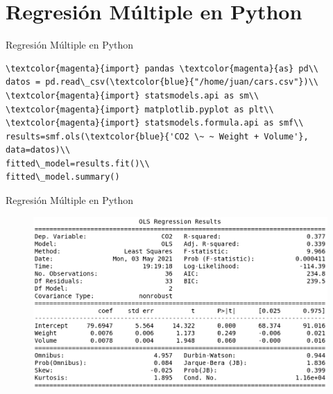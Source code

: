 \documentclass{beamer}
\begin{document}
\section{Regresión Múltiple en Python}

\begin{frame}{Regresión Múltiple en Python}
\scriptsize
\begin{verbatim}
\textcolor{magenta}{import} pandas \textcolor{magenta}{as} pd\\
datos = pd.read\_csv(\textcolor{blue}{"/home/juan/cars.csv"})\\
\textcolor{magenta}{import} statsmodels.api as sm\\
\textcolor{magenta}{import} matplotlib.pyplot as plt\\
\textcolor{magenta}{import} statsmodels.formula.api as smf\\
results=smf.ols(\textcolor{blue}{'CO2 \~ ~ Weight + Volume'}, data=datos)\\
fitted\_model=results.fit()\\
fitted\_model.summary()
\end{verbatim}
\end{frame}

\begin{frame}{Regresión Múltiple en Python}
\begin{figure}
\includegraphics[width=.85\textwidth]{output2.png}
\end{figure}
\end{frame}
\end{document}
